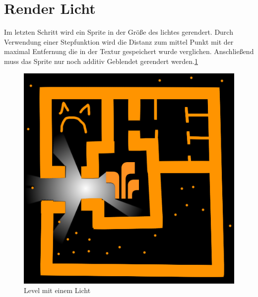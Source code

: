 \section{Render Licht}
Im letzten Schritt wird ein Sprite in der Größe des lichtes gerendert. Durch Verwendung einer Stepfunktion wird die Distanz zum mittel Punkt mit der maximal Entfernung die in der Textur gespeichert wurde verglichen.
Anschließend muss das Sprite nur noch additiv Geblendet gerendert werden.\ref{level_licht_1}

\begin{figure}
	\centering
	\includegraphics[scale=0.75]{images/final.png}
	\caption{Level mit einem Licht}
	\label{level_licht_1}
\end{figure}